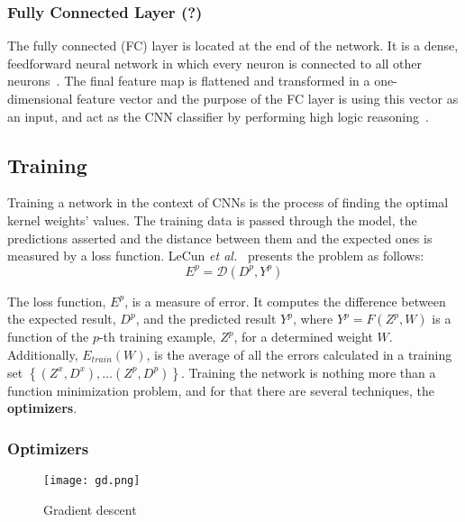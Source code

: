 \documentclass[class=report, crop=false, a4paper, 12pt]{standalone}
\begin{document}
\subsubsection{Fully Connected Layer (?)}
The fully connected (FC) layer is located at the end of the network. It is a dense, feedforward neural network in which every neuron is connected to all other neurons~\autocite{yamashitaConvolutionalNeuralNetworks2018, alzubaidiReviewDeepLearning2021}. The final feature map is flattened and transformed in a one-dimensional feature vector and the purpose of the FC layer is using this vector as an input, and act as the CNN classifier by performing high logic reasoning~\autocite{guRecentAdvancesConvolutional2018}.

\subsection{Training}
Training a network in the context of CNNs is the process of finding the optimal kernel weights' values. The training data is passed through the model, the predictions asserted and the distance between them and the expected ones is measured by a loss function. LeCun \textit{et al.}~\autocite{lecunGradientBasedLearningApplied1998} presents the problem as follows:
$$
E^p = \mathcal{D}(D^p, Y^p)
$$

\noindent The loss function, $E^p$, is a measure of error. It computes the difference between the expected result, $D^p$, and the predicted result $Y^p$, where $Y^p = F(Z^p, W)$ is a function of the $p$-th training example, $Z^p$, for a determined weight $W$. Additionally, $E_{train}(W)$, is the average of all the errors calculated in a training set $\left\{(Z^x, D^x),\dots (Z^p, D^p)\right\}$. Training the network is nothing more than a function minimization problem, and for that there are several techniques, the \textbf{optimizers}.

\subsubsection{Optimizers}

\begin{figure}[!h]
    \centering
    \texttt{[image: gd.png]} %
    \caption{Gradient descent}
    \label{fig:gd}
\end{figure}
\end{document}
